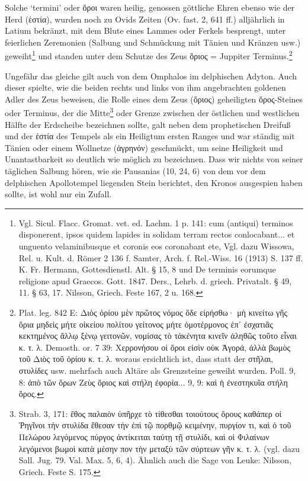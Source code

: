 \documentclass[a4paper, 11pt, oneside]{article}
\begin{document}
Solche `termini' oder ὅροι waren heilig, genossen göttliche Ehren ebenso wie der Herd (ἑστία), wurden noch zu Ovids Zeiten (Ov. fast. 2, 641 ff.) alljährlich in Latium bekränzt, mit dem Blute eines Lammes oder Ferkels besprengt, unter feierlichen Zeremonien (Salbung und Schmückung mit Tänien und Kränzen usw.) geweiht\footnote{Vgl. Sicul. Flacc. Gromat. vet. ed. Lachm. 1 p. 141: cum (antiqui) terminos disponerent, ipsos quidem lapides in solidam terram rectos conlocabant... et unguento velaminibusque et coronis eos coronabant ete, Vgl. dazu Wissowa, Rel. u. Kult. d. Römer 2 136 f. Samter, Arch. f. Rel.-Wiss. 16 (1913) S. 137 ff. K. Fr. Hermann, Gottesdienstl. Alt. § 15, 8 und De terminis eorumque religione apud Graecos. Gott. 1847. Ders., Lehrb. d. griech. Privatalt. § 49, 11. § 63, 17. Nilsson, Griech. Feste 167, 2 u. 168.} und standen unter dem Schutze des Zeus ὅριος = Juppiter Terminus.\footnote{Plat. leg. 842 E: Διὸς ὁρίου μὲν πρῶτος νόμος ὅδε εἰρήσθω· μὴ κινείτω γῆς ὅρια μηδεὶς μήτε οἰκείου πολίτου γείτονος μήτε ὁμοτέρμονος ἐπ᾽ ἐσχατιᾶς κεκτημένος ἄλλῳ ξένῳ γειτονῶν, νομίσας τὸ τἀκένητα κινεῖν ἀληθῶς τοῦτο εἶναι κ. τ. λ. Demosth. or. 7 39: Χερρονήσου οἱ ὅροι εἰσὶν οὐκ Ἀγορά, ἀλλὰ βωμὸς τοῦ Διὸς τοῦ ὁρίου κ. τ. λ. woraus ersichtlich ist, dass statt der στῆλαι, στυλίδες usw. mehrfach auch Altäre als Grenzsteine geweiht wurden. Poll. 9, 8: ἀπὸ τῶν ὅρων Ζεὺς ὅριος καὶ στήλη ἐφορία... 9, 9: καὶ ἡ ἐνεστηκυῖα στήλη ὅρος.}

Ungefähr das gleiche gilt auch von dem Omphalos im delphischen Adyton. Auch dieser spielte, wie die beiden rechts und links von ihm angebrachten goldenen Adler des Zeus beweisen, die Rolle eines dem Zeus (ὅριος) geheiligten ὅρος-Steines oder Terminus, der die Mitte\footnote{Strab. 3, 171: ἔθος παλαιὸν ὑπῆρχε τὸ τίθεσθαι τοιούτους ὅρους καθάπερ οἱ Ῥηγῖνοι τὴν στυλίδα ἔθεσαν τὴν ἐπὶ τῷ πορθμῷ κειμένην, πυργίον τι, καὶ ὁ τοῦ Πελώρου λεγόμενος πύργος ἀντίκειται ταύτῃ τῇ στυλίδι, καὶ οἱ Φιλαίνων λεγόμενοι βωμοὶ κατὰ μέσην πον τὴν μεταξὺ τῶν σύρτεων γῆν κ. τ. λ. (vgl. dazu Sall. Jug. 79. Val. Max. 5, 6, 4). Ähnlich auch die Sage von Leuke: Nilsson, Griech. Feste S. 175.} oder Grenze zwischen der östlichen und westlichen Hälfte der Erdscheibe bezeichnen sollte, galt neben dem prophetischen Dreifuß und der ἑστία des Tempels als ein Heiligtum ersten Ranges und war ständig mit Tänien oder einem Wollnetze (ἀγρηνόν) geschmückt, um seine Heiligkeit und Unantastbarkeit so deutlich wie möglich zu bezeichnen. Dass wir nichts von seiner täglichen Salbung hören, wie sie Pausanias (10, 24, 6) von dem vor dem delphischen Apollotempel liegenden Stein berichtet, den Kronos ausgespien haben sollte, ist wohl nur ein Zufall.
\end{document}
